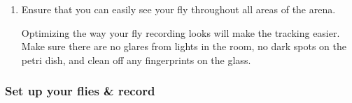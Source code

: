 \documentclass[letterpaper,10pt,english]{jupyterBook}
\begin{document}
\begin{enumerate}
\sphinxAtStartPar
{}

\item {} 
\sphinxAtStartPar
Ensure that you can easily see your fly throughout all areas of the arena.

\sphinxAtStartPar
{} Optimizing the way your fly recording looks will make the tracking  easier. Make sure there are no glares from lights in the room, no dark spots on the petri dish, and clean off any fingerprints on the glass. 

\end{enumerate}


\subsubsection{Set up your flies \& record}
\label{\detokenize{Drosophila/Day1:set-up-your-flies-record}}
\sphinxAtStartPar
{}
\end{document}
